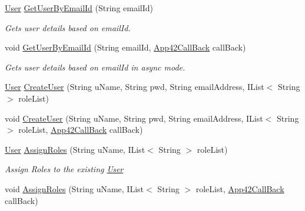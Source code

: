 \begin{DoxyCompactItemize}
\hyperlink{classcom_1_1shephertz_1_1app42_1_1paas_1_1sdk_1_1csharp_1_1user_1_1_user}{User} \hyperlink{classcom_1_1shephertz_1_1app42_1_1paas_1_1sdk_1_1csharp_1_1user_1_1_user_service_a7147fdebd892f4f709c9d54cb2ad9f56}{Get\+User\+By\+Email\+Id} (String email\+Id)
\begin{DoxyCompactList}\small\item\em Gets user details based on email\+Id. \end{DoxyCompactList}\item 
void \hyperlink{classcom_1_1shephertz_1_1app42_1_1paas_1_1sdk_1_1csharp_1_1user_1_1_user_service_ad701eeafc7a1d9aa9fb6c6cd46cf0a1d}{Get\+User\+By\+Email\+Id} (String email\+Id, \hyperlink{interfacecom_1_1shephertz_1_1app42_1_1paas_1_1sdk_1_1csharp_1_1_app42_call_back}{App42\+Call\+Back} call\+Back)
\begin{DoxyCompactList}\small\item\em Gets user details based on email\+Id in async mode. \end{DoxyCompactList}\item 
\hyperlink{classcom_1_1shephertz_1_1app42_1_1paas_1_1sdk_1_1csharp_1_1user_1_1_user}{User} \hyperlink{classcom_1_1shephertz_1_1app42_1_1paas_1_1sdk_1_1csharp_1_1user_1_1_user_service_a2cd7c1c2bbc2b44115b5eb4e3883e7c6}{Create\+User} (String u\+Name, String pwd, String email\+Address, I\+List$<$ String $>$ role\+List)
\item 
void \hyperlink{classcom_1_1shephertz_1_1app42_1_1paas_1_1sdk_1_1csharp_1_1user_1_1_user_service_a2d94fb3afde71ba77ebcd5459a53e101}{Create\+User} (String u\+Name, String pwd, String email\+Address, I\+List$<$ String $>$ role\+List, \hyperlink{interfacecom_1_1shephertz_1_1app42_1_1paas_1_1sdk_1_1csharp_1_1_app42_call_back}{App42\+Call\+Back} call\+Back)
\item 
\hyperlink{classcom_1_1shephertz_1_1app42_1_1paas_1_1sdk_1_1csharp_1_1user_1_1_user}{User} \hyperlink{classcom_1_1shephertz_1_1app42_1_1paas_1_1sdk_1_1csharp_1_1user_1_1_user_service_a9f567248839b2247bb51e642dd72700e}{Assign\+Roles} (String u\+Name, I\+List$<$ String $>$ role\+List)
\begin{DoxyCompactList}\small\item\em Assign Roles to the existing \hyperlink{classcom_1_1shephertz_1_1app42_1_1paas_1_1sdk_1_1csharp_1_1user_1_1_user}{User} \end{DoxyCompactList}\item 
void \hyperlink{classcom_1_1shephertz_1_1app42_1_1paas_1_1sdk_1_1csharp_1_1user_1_1_user_service_a119b160922d4d9f1bde56fc1e263aed2}{Assign\+Roles} (String u\+Name, I\+List$<$ String $>$ role\+List, \hyperlink{interfacecom_1_1shephertz_1_1app42_1_1paas_1_1sdk_1_1csharp_1_1_app42_call_back}{App42\+Call\+Back} call\+Back)

\end{DoxyCompactItemize}
